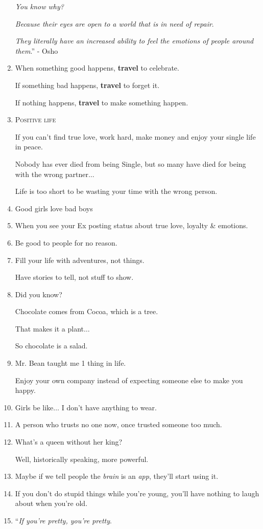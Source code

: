 \documentclass{article}
\begin{document}
\begin{enumerate}
	\textit{You know why?}
	
	\textit{Because their eyes are open to a world that is in need of repair}.
	
	\textit{They literally have an increased ability to feel the emotions of people around them}.'' - Osho
	\item When something good happens, \textbf{travel} to celebrate.
	
	If something bad happens, \textbf{travel} to forget it.
	
	If nothing happens, \textbf{travel} to make something happen.
	\item \textsc{Positive life}
	
	If you can't find true love, work hard, make money and enjoy your single life in peace.
	
	Nobody has ever died from being Single, but so many have died for being with the wrong partner$\ldots$
	
	Life is too short to be wasting your time with the wrong person.
	\item Good girls love bad boys
	\item When you see your Ex posting status about true love, loyalty \& emotions.
	\item Be good to people for no reason.
	\item Fill your life with adventures, not things.
	
	Have stories to tell, not stuff to show.
	\item Did you know?
	
	Chocolate comes from Cocoa, which is a tree.
	
	That makes it a plant$\ldots$
	
	So chocolate is a salad.
	\item Mr. Bean taught me 1 thing in life.
	
	Enjoy your own company instead of expecting someone else to make you happy.
	\item Girls be like$\ldots$ I don't have anything to wear.
	\item A person who trusts no one now, once trusted someone too much.
	\item What's a queen without her king?
	
	Well, historically speaking, more powerful.
	\item Maybe if we tell people the \textit{brain} is an \textit{app}, they'll start using it.
	\item If you don't do stupid things while you're young, you'll have nothing to laugh about when you're old.
	\item ``\textit{If you're pretty, you're pretty}.
	

\end{enumerate}
\end{document}
